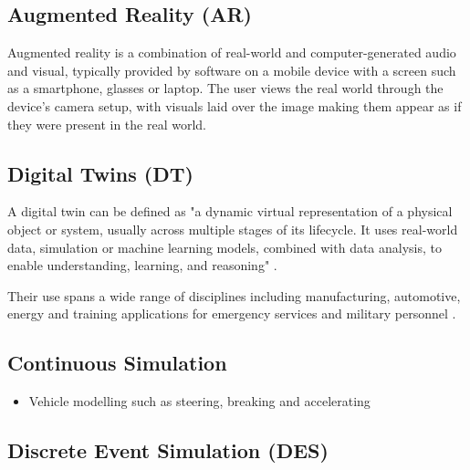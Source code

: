 \documentclass{article}
\begin{document}
\subsection{Augmented Reality (AR)}

Augmented reality is a combination of real-world and computer-generated audio and visual, typically provided by software on a mobile device with a screen such as a smartphone, glasses or laptop. The user views the real world through the device's camera setup, with visuals laid over the image making them appear as if they were present in the real world.


\subsection{Digital Twins (DT)}

A digital twin can be defined as "a dynamic virtual representation of a physical object or system, usually across multiple stages of its lifecycle. It uses real-world data, simulation or machine learning models, combined with data analysis, to enable understanding, learning, and reasoning" \cite{stanford2019digital}. 

Their use spans a wide range of disciplines including manufacturing, automotive, energy \cite{PYLIANIDIS2021105942}
 and training applications for emergency services \cite{ScientificReports1} and military personnel \cite{9345490}. 

\subsection{Continuous Simulation}


\begin{itemize}
  \item Vehicle modelling such as steering, breaking and accelerating
\end{itemize}

\subsection{Discrete Event Simulation (DES)}


\end{document}
